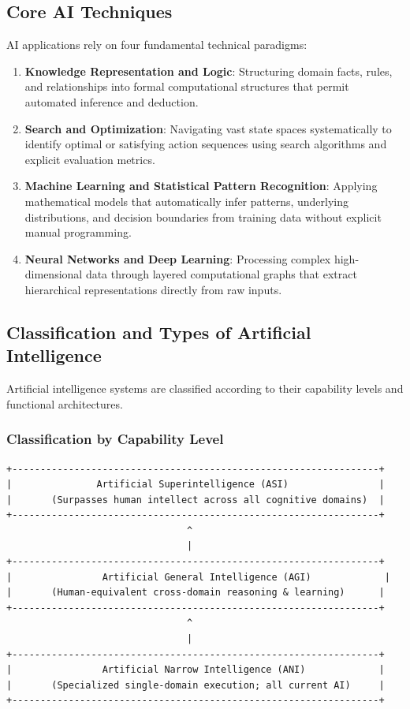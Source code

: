 \documentclass[12pt]{report}
\begin{document}
\subsection{Core AI Techniques}

AI applications rely on four fundamental technical paradigms:

\begin{enumerate}
    \item \textbf{Knowledge Representation and Logic}: Structuring domain facts, rules, and relationships into formal computational structures that permit automated inference and deduction.
    \item \textbf{Search and Optimization}: Navigating vast state spaces systematically to identify optimal or satisfying action sequences using search algorithms and explicit evaluation metrics.
    \item \textbf{Machine Learning and Statistical Pattern Recognition}: Applying mathematical models that automatically infer patterns, underlying distributions, and decision boundaries from training data without explicit manual programming.
    \item \textbf{Neural Networks and Deep Learning}: Processing complex high-dimensional data through layered computational graphs that extract hierarchical representations directly from raw inputs.
\end{enumerate}

\subsection{Classification and Types of Artificial Intelligence}

Artificial intelligence systems are classified according to their capability levels and functional architectures.

\subsubsection{Classification by Capability Level}

\begin{verbatim}
+-----------------------------------------------------------------+
|               Artificial Superintelligence (ASI)                |
|       (Surpasses human intellect across all cognitive domains)  |
+-----------------------------------------------------------------+
                                ^
                                |
+-----------------------------------------------------------------+
|                Artificial General Intelligence (AGI)             |
|       (Human-equivalent cross-domain reasoning & learning)      |
+-----------------------------------------------------------------+
                                ^
                                |
+-----------------------------------------------------------------+
|                Artificial Narrow Intelligence (ANI)             |
|       (Specialized single-domain execution; all current AI)     |
+-----------------------------------------------------------------+
\end{verbatim}
\end{document}
